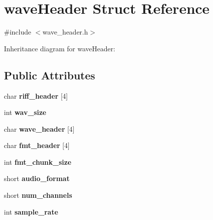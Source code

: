 \hypertarget{structwaveHeader}{}\section{wave\+Header Struct Reference}
\label{structwaveHeader}


{\ttfamily \#include $<$wave\+\_\+header.\+h$>$}



Inheritance diagram for wave\+Header\+:
\subsection*{Public Attributes}
\begin{DoxyCompactItemize}
\item 
\mbox{\label{structwaveHeader_a4c51a8412affff1e9693a50c084127dd}} 
char {\bfseries riff\+\_\+header} \mbox{[}4\mbox{]}
\item 
\mbox{\label{structwaveHeader_a396f77e15992677d6b86ae300219df08}} 
int {\bfseries wav\+\_\+size}
\item 
\mbox{\label{structwaveHeader_a30b63fa74480f78958663c4e2c055f5e}} 
char {\bfseries wave\+\_\+header} \mbox{[}4\mbox{]}
\item 
\mbox{\label{structwaveHeader_acb185534e1a3e4502ce8eeb515f7319b}} 
char {\bfseries fmt\+\_\+header} \mbox{[}4\mbox{]}
\item 
\mbox{\label{structwaveHeader_af1100f94c22afc49c88bf2f8c9593b5b}} 
int {\bfseries fmt\+\_\+chunk\+\_\+size}
\item 
\mbox{\label{structwaveHeader_a91d09283d8e40e8003604fd2fcda3109}} 
short {\bfseries audio\+\_\+format}
\item 
\mbox{\label{structwaveHeader_a9a2e0e2e4d5bd5f7e7c372d2d156fed0}} 
short {\bfseries num\+\_\+channels}
\item 
\mbox{\label{structwaveHeader_a7bcd51d130d17c816cbbf1e1bc283020}} 
int {\bfseries sample\+\_\+rate}
\item 
\mbox{\label{structwaveHeader_a61183cddb5eb5317bed71304da534f49}} 

\end{DoxyCompactItemize}
